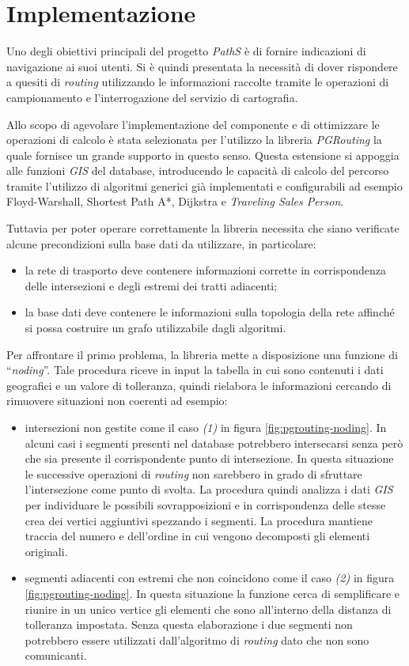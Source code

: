 \section{Implementazione}
Uno degli obiettivi principali del progetto \emph{PathS} è di fornire indicazioni di navigazione ai suoi utenti. Si è quindi presentata la necessità di dover rispondere a quesiti di \emph{routing} utilizzando le informazioni raccolte tramite le operazioni di campionamento e l'interrogazione del servizio di cartografia. 

Allo scopo di agevolare l'implementazione del componente e di ottimizzare le operazioni di calcolo è stata selezionata per l'utilizzo la libreria \emph{PGRouting} la quale fornisce un grande supporto in questo senso. Questa estensione si appoggia alle funzioni \emph{GIS} del database, introducendo le capacità di calcolo del percorso tramite l'utilizzo di algoritmi generici già implementati e configurabili ad esempio Floyd-Warshall, Shortest Path A*, Dijkstra e \emph{Traveling Sales Person}.

Tuttavia per poter operare correttamente la libreria necessita che siano verificate alcune precondizioni sulla base dati da utilizzare, in particolare:
\begin{itemize}
	\item la rete di trasporto deve contenere informazioni corrette in corrispondenza delle intersezioni e degli estremi dei tratti adiacenti;
	\item la base dati deve contenere le informazioni sulla topologia della rete affinché si possa costruire un grafo utilizzabile dagli algoritmi.
\end{itemize}

Per affrontare il primo problema, la libreria mette a disposizione una funzione di ``\emph{noding}''. Tale procedura riceve in input la tabella in cui sono contenuti i dati geografici e un valore di tolleranza, quindi rielabora le informazioni cercando di rimuovere situazioni non coerenti ad esempio:
\begin{itemize}
 \item intersezioni non gestite come il caso \emph{(1)} in figura \ref{fig:pgrouting-noding}. In alcuni casi i segmenti presenti nel database potrebbero intersecarsi senza però che sia presente il corrispondente punto di intersezione. In questa situazione le successive operazioni di \emph{routing} non sarebbero in grado di sfruttare l'intersezione come punto di svolta. La procedura quindi analizza i dati \emph{GIS} per individuare le possibili sovrapposizioni e in corrispondenza delle stesse crea dei vertici aggiuntivi spezzando i segmenti. La procedura mantiene traccia del numero e dell'ordine in cui vengono decomposti gli elementi originali.
 \item segmenti adiacenti con estremi che non coincidono come il caso \emph{(2)} in figura \ref{fig:pgrouting-noding}. In questa situazione la funzione cerca di semplificare e riunire in un unico vertice gli elementi che sono all'interno della distanza di tolleranza impostata. Senza questa elaborazione i due segmenti non potrebbero essere utilizzati dall'algoritmo di \emph{routing} dato che non sono comunicanti.
\end{itemize}

